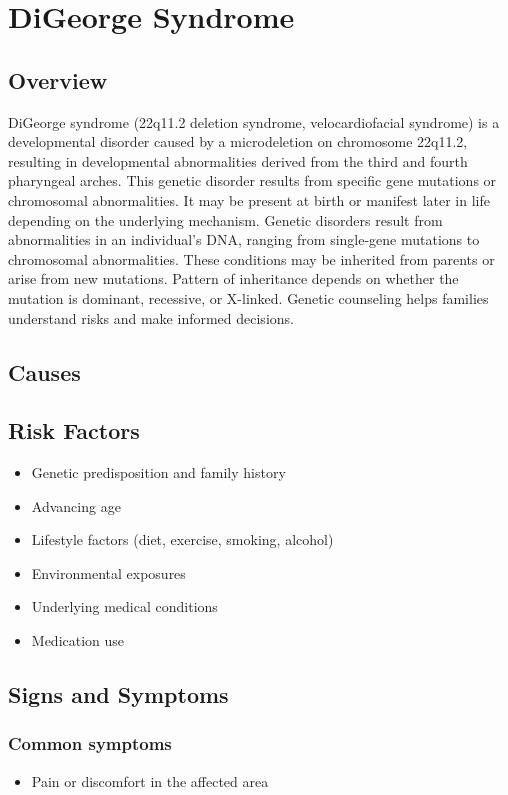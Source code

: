 \chapter{DiGeorge Syndrome}
\label{sec:DiGeorge Syndrome}

\section{Overview}
DiGeorge syndrome (22q11.2 deletion syndrome, velocardiofacial syndrome) is a developmental disorder caused by a microdeletion on chromosome 22q11.2, resulting in developmental abnormalities derived from the third and fourth pharyngeal arches. This genetic disorder results from specific gene mutations or chromosomal abnormalities. It may be present at birth or manifest later in life depending on the underlying mechanism. Genetic disorders result from abnormalities in an individual's DNA, ranging from single-gene mutations to chromosomal abnormalities. These conditions may be inherited from parents or arise from new mutations. Pattern of inheritance depends on whether the mutation is dominant, recessive, or X-linked. Genetic counseling helps families understand risks and make informed decisions.
\section{Causes}
\section{Risk Factors}

\begin{itemize}[noitemsep]
  \item Genetic predisposition and family history
  \item Advancing age
  \item Lifestyle factors (diet, exercise, smoking, alcohol)
  \item Environmental exposures
  \item Underlying medical conditions
  \item Medication use
\end{itemize}
\section{Signs and Symptoms}

\subsection{Common symptoms}
\begin{itemize}[noitemsep]
  \item Pain or discomfort in the affected area
  \end{itemize}

